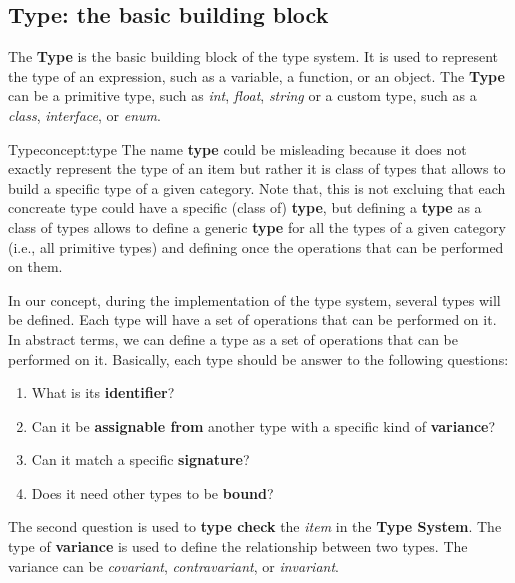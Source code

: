 \subsection{Type: the basic building block}\label{subsec:concept:TypeTheBasicBuildingBlock}

The \textbf{Type} is the basic building block of the type system. It is used to represent the type of an expression, such as a variable, a function, or an object. The \textbf{Type} can be a primitive type, such as \textit{int}, \textit{float}, \textit{string} or a custom type, such as a \textit{class}, \textit{interface}, or \textit{enum}.

\begin{mydefinition}{Type}{concept:type}
The name \textbf{type} could be misleading because it does not exactly represent the type of an item but rather it is class of types that allows to build a specific type of a given category. Note that, this is not excluing that each concreate type could have a specific (class of) \textbf{type}, but defining a \textbf{type} as a class of types allows to define a generic \textbf{type} for all the types of a given category (i.e., all primitive types) and defining once the operations that can be performed on them.
\end{mydefinition}

In our concept, during the implementation of the type system, several types will be defined. Each type will have a set of operations that can be performed on it. In abstract terms, we can define a type as a set of operations that can be performed on it.
Basically, each type should be answer to the following questions:
\begin{enumerate}
    \item What is its \textbf{identifier}?
    \item Can it be \textbf{assignable from} another type with a specific kind of \textbf{variance}?
    \item Can it match a specific \textbf{signature}?
    \item Does it need other types to be \textbf{bound}?
\end{enumerate}

The second question is used to \textbf{type check} the \textit{item} in the \textbf{Type System}. The type of \textbf{variance} is used to define the relationship between two types. The variance can be \textit{covariant}, \textit{contravariant}, or \textit{invariant}.

